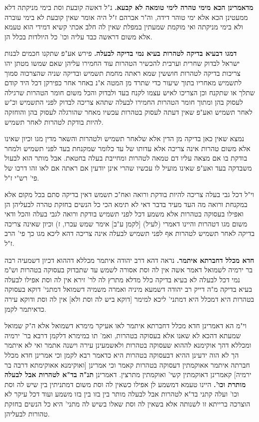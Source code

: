 \documentclass[12pt, openany]{book}
\newcommand{\sethebfont}{
\fontsize{10.5pt}{21.0pt} \selectfont
}
\newcommand{\twocol}[1]{
	{\sethebfont \begin{multicols}{2}
			#1
	\end{multicols}}	
}
\begin{document}
\twocol{\textbf{מדאמרינן הכא מימי טהרה לימי טומאה לא קבעא.}  נ"ל דאשה קובעת וסת בימי מניקתה דלא ממעטינן הכא אלא ימי טוהר דידה, וה"ר אברהם ז"ל היה אומר שאין קובעת לא בימי עוברה ולא בימי מניקתה ואי מוקמת שמעתין במפלת שאין לה חלב אכתי קשיא דמידי הוא טעמא אלא משום דראשה כבד עליה וכו' כל היולדות בכלל הן. 
\par\textbf{דמגו דבעיא בדיקה לטהרות בעיא נמי בדיקה לבעלה.}  פירש אע"פ שתקנו חכמים לבנות ישראל לבדוק שחרית וערבית להכשיר הטהרות עוד החמירו עליהן שאם שמשו מטתן יהו צריכות בדיקה לטהרות חוששין שמא ראתה מחמת תשמיש ובדיקה שניה שהצרכוה סמוך לתשמיש מאחריו בתוך שיעור כדי שתרד מן המטה א"נ באחר אחר כפירקן דכל היד קודם שתלך או שתקנח וכן הצריכו לאיש עצמו לקנח בעד ולבדוק והכל משום חומר הטהרות שרגילה לעסוק בהן ומתוך חומר הטהרות החמירו לבעלה שתהא צריכה לבדוק לפני התשמיש וכ"ש לאחר תשמיש ואע"פ שאין דעתה לעסוק בטהרות עכשיו מאחר שהורגלה לעסוק בהן והוחזקה להיות בודקת לטהרות לאחר תשמיש.\par  נמצא שאין כאן בדיקה מן הדין אלא שלאחר תשמיש ולטהרות והשאר מדין מגו וכיון שאינו אלא משום טהרות אינה צריכה אלא עדותו של עד כלומר שמקנחת בעד לפני תשמיש ולמחר בודקת בו אם מצאה עליו דם טמאה לטהרות ומחייבת בעלה בחטאת. אבל מותר הוא לבעול משבדקה בעד ואע"פ שאינו מועיל לו עכשיו שהרי אינן יודעין אם ראתה אם לאו זהו דרכו של פי' רש"י ז"ל.\par  וי"ל דכל גבי בעלה צריכה להיות בודקת ורואה ואח"כ תשמש דאין בדיקה סתם בכל מקום אלא במקנחת ורואה מה העד מעיד בדבר דאי לא תימא הכי כל הנשים בחזקת טהרה לבעליהן הן ואפילו בעסוקה בטהרות אלא משמע דכל לפני תשמיש בודקת ורואה לגבי בעלה והכל ודאי משום מגו דטהרות והיינו דאמרי (לעיל) [לקמן ע"ב] אימר שמש עכרו, ז) וכיון שאינה צריכה בדיקה לאחר תשמיש לטהרות אף לפני תשמיש לבעלה אינה צריכה דהא ליכא מגו כך פי' הרב ז"ל. 
\par\textbf{חדא מכלל דחברתא איתמר.}  נראה דהא דרב יהודה איתמר מכללא דההוא דכיון דשמעיה רבה בר ירמיה לשמואל דאמר אשה אין לה וסת אסורה לשמש עד שתבדוק בעסוקה בטהרות וש"מ נמי דכל לבעלה לא בעיא בדיקה כלל מדלא מתרץ לה לר' זירא אין לה וסת אפילו לבעלה בעיא בדיקה מ"ה דייק רב יהודה דשמעא מיניה ואמרה משמיה דשמואל דמתני' דוקא בעסוקה בטהרות היא דמכלל היא דמתני' ליכא למימר [דוקא ביש לה וסת ולא] אין לה וסת ודוקא עירה כדאיתמר לקמן.\par  וי"מ הא דאמרינן חדא מכלל דחברתא איתמר לאו אעיקר מימרא דשמואל אלא ה"ק שמואל שמעתא דהכא לא שאנו אלא בעסוקה בטהרות, ואמ' תו במימרא דלקמן דרבא בר' ירמיה ומכללא דהך אוקימנא לההוא שעסוקה בטהרות ולאשמעינן עירה וישנה אתמר ואי לא איתמר הך לא הוה ידעינן ההיא דבעסוקה בטהרות היא כדאמר רבא לקמן וכי אמרינן חדא מכלל חברתה איתמר אאוקמתין דעסוקה בטהרות קאמר וכי אמרינן [ואוקימנא אאוקימתא דרבה בר ירמיה] קאמרינן דאוקמתין קשי' ואוקמתין מתרצין. 
\parהא דאמרינן \textbf{תנ"ה בד"א לטהרות אבל לבעלה מותרת וכו'.}  היינו טעמא דמשמע לן אפילו כשאין לה וסת משום דמתניתין בין שיש לה וסת וכו' ועלה קתני בד"א לטהרות אבל לבעלה מותר בין בזו בין בזו משמע ועוד דכל עיקר לא הוצרכה ברייתא זו לשנותה אלא בשאין לה וסת שאלו בשיש לה מתני' היא כל הנשים בחזקת טהורות לבעליהן. 
\par}
\end{document}
